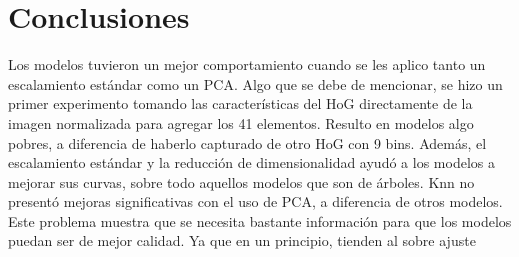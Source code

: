 \documentclass[12pt,a4paper]{report}
\begin{document}
\chapter{Conclusiones}
Los modelos tuvieron un mejor comportamiento cuando se les aplico tanto un escalamiento estándar como un PCA.
Algo que se debe de mencionar, se hizo un primer experimento tomando las características del HoG directamente de la imagen normalizada para agregar los 41 elementos. Resulto en modelos algo pobres, a diferencia de haberlo capturado de otro HoG con 9 bins. Además, el escalamiento estándar y la reducción de dimensionalidad ayudó a los modelos a mejorar sus curvas, sobre todo aquellos modelos que son de árboles.
Knn no presentó mejoras significativas con el uso de PCA, a diferencia de otros modelos. Este problema muestra que se necesita bastante información para que los modelos puedan ser de mejor calidad. Ya que en un principio, tienden al sobre ajuste


\end{document}
